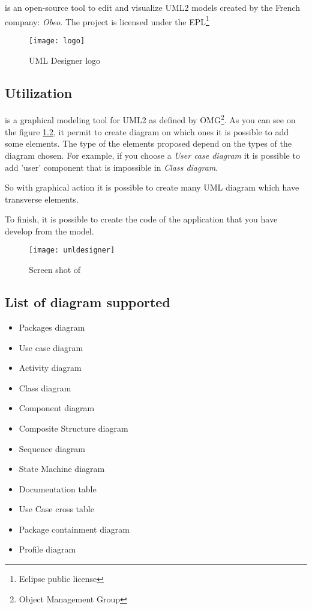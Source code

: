 \chapter{\umld}
\label{chap:UMLDesigner}


\umld is an open-source tool to edit and visualize UML2 models created by the French company:
\textit{Obeo}. The project is licensed under the EPL\footnote{Eclipse public license}

\begin{figure}[h] \centering
  \texttt{[image: logo]}
  \caption{UML Designer logo}
  \label{fig:logo}
\end{figure}

\section{Utilization}

\umld is a graphical modeling tool for UML2 as defined by OMG\footnote{Object Management Group\cite{omg}}. As
you can see on the figure \ref{fig:umldesigner}, it permit to create diagram on which ones it is
possible to add some elements. The type of the elements proposed depend on the types of the diagram
chosen. For example, if you choose a \textit{User case diagram} it is possible to add 'user'
component that is impossible in \textit{Class diagram}.

So with graphical action it is possible to create many UML diagram which have transverse elements.

To finish, it is possible to create the code of the application that you have develop from the
model.


\begin{figure}[h] \centering
  \texttt{[image: umldesigner]}
  \caption{Screen shot of \umld}
  \label{fig:umldesigner}
\end{figure}



\section{List of diagram supported}

\begin{itemize}
\item Packages diagram
\item Use case diagram
\item Activity diagram
\item Class diagram
\item Component diagram
\item Composite Structure diagram
\item Sequence diagram
\item State Machine diagram
\item Documentation table
\item Use Case cross table
\item Package containment diagram
\item Profile diagram
\end{itemize}



